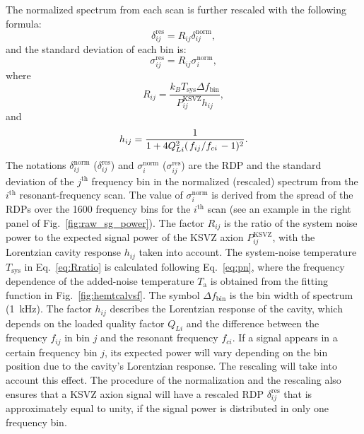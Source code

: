 \documentclass[%
reprint, %
superscriptaddress,
 amsmath,amssymb,
 aps
]{revtex4-2}
\begin{document}
The normalized spectrum from each scan is further rescaled 
 with the following formula:
\begin{equation}
  \label{eq:respower_eqn}
  \delta_{ij}^\text{res} = R_{ij}\delta_{ij}^\text{norm},
\end{equation}
and the standard deviation of each bin is:
\begin{equation}
  \label{eq:ressigma_eqn}
  \sigma_{ij}^\text{res} = R_{ij}\sigma_{i}^\text{norm},
\end{equation}
where 
 \begin{equation}
 R_{ij} = \frac{k_{B}T_\text{sys} \Delta f_\text{bin} }{P_{ij}^\text{KSVZ} h_{ij}}, 
 \label{eq:Rratio}
 \end{equation}
and 
 \begin{equation}
 h_{ij} = \frac{1}{1 + 4Q_{Li}^{2}(\left.f_{ij}\middle/f_{ci}\right.-1)^2}. 
 \label{eq:Lorentz}
 \end{equation}
The notations $\delta_{ij}^\text{norm}$ ($\delta_{ij}^\text{res}$) and 
$\sigma_{i}^\text{norm}$ ($\sigma_{ij}^\text{res}$) are the 
RDP and the standard deviation of the $j^\text{th}$ frequency bin in 
the normalized (rescaled) spectrum from the 
$i^\text{th}$ resonant-frequency scan. 
The value of $\sigma_{i}^\text{norm}$ is derived from the spread of the 
RDPs over the 1600 frequency bins for the $i^\text{th}$ scan 
(see an example in the right panel of Fig.~\ref{fig:raw_sg_power}). 
The factor $R_{ij}$ is the ratio of 
the system noise power to the expected signal power of the KSVZ axion 
$P_{ij}^\text{KSVZ}$, with the Lorentzian cavity response $h_{ij}$ 
taken into account. 
The system-noise temperature $T_\text{sys}$ in Eq.~\eqref{eq:Rratio} is 
calculated following Eq.~\eqref{eq:pn},
 where the frequency dependence of the added-noise temperature $T_\text{a}$ is 
obtained from the fitting function in Fig.~\ref{fig:hemtcalvsf}. 
The symbol $\Delta f_\text{bin}$ is the bin width of spectrum (1~kHz). 
The factor $h_{ij}$ describes the Lorentzian response of the cavity, 
which depends on the loaded quality factor $Q_{Li}$ and the 
difference between the frequency $f_{ij}$ in bin $j$ and the resonant 
frequency $f_{ci}$. 
%
If a signal appears in a certain frequency bin $j$, its expected power 
will vary depending on the bin position due to the cavity's 
Lorentzian response. The rescaling will take into account this effect. 
The procedure of the normalization and the rescaling also ensures that a 
KSVZ axion signal will have a rescaled RDP $\delta_{ij}^\text{res}$ 
that is approximately equal to unity, if the signal power is distributed 
in only one frequency bin. 
\end{document}
